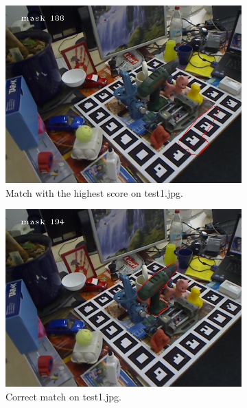 \documentclass{article}
\begin{document}
\begin{figure}[H]
\begin{subfigure}{.5\textwidth}
  \centering
  \includegraphics[width=.9\linewidth]{Images/driller_score1.jpg}  
  \caption{Match with the highest score on test1.jpg.}
\end{subfigure}
\begin{subfigure}{.5\textwidth}
  \centering
  \includegraphics[width=.9\linewidth]{Images/driller_best1.jpg}  
  \caption{Correct match on test1.jpg.}
\end{subfigure}
\newline
\vspace{0.5cm}
\begin{subfigure}{.5\textwidth}
  \centering

\end{subfigure}
\end{figure}
\end{document}
